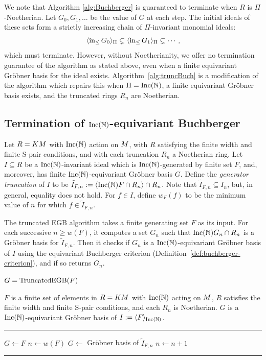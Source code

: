 We note that Algorithm \ref{alg:Buchberger} is guaranteed to terminate when $R$ is $\Pi$-Noetherian.  Let $G_0,G_1,\ldots$ be the value of $G$ at each step.  The initial ideals of these sets form a strictly increasing chain of $\Pi$-invariant monomial ideals:
 \[ \langle \operatorname{in}_{\leq} G_0 \rangle_\Pi \subsetneq \langle \operatorname{in}_{\leq} G_1 \rangle_\Pi \subsetneq \cdots,\]
which must terminate.  However, without Noetherianity, we offer no termination guarantee of the algorithm as stated above, even when a finite equivariant Gr\"obner basis for the ideal exists.  Algorithm~\ref{alg:truncBuch} is a modification of the algorithm which repairs this when $\Pi = \operatorname{Inc}(\mathbb N)$, a finite equivariant Gr\"obner basis exists, and the truncated rings $R_n$ are Noetherian.

\subsection{Termination of $\operatorname{Inc}(\mathbb N)$-equivariant Buchberger}
Let $R = KM$ with $\operatorname{Inc}(\mathbb N)$ action on $M$, with $R$ satisfying the finite width and finite S-pair conditions, and with each truncation $R_n$ a Noetherian ring.  Let $I \subseteq R$ be a $\operatorname{Inc}(\mathbb N)$-invariant ideal which is $\operatorname{Inc}(\mathbb N)$-generated by finite set $F$, and, moreover, has finite $\operatorname{Inc}(\mathbb N)$-equivariant Gr\"obner basis $G$.  Define the {\em generator truncation} of $I$ to be $\tilde{I}_{F,n} := \langle \operatorname{Inc}(\mathbb N) F \cap R_n \rangle \cap R_n$.  Note that $\tilde{I}_{F,n} \subseteq I_n$, but, in general, equality does not hold.  For $f \in I$, define $w_F(f)$ to be the minimum value of $n$ for which $f \in \tilde{I}_{F,n}$.

The truncated EGB algorithm takes a finite generating set $F$ as its input.  For each successive $n \geq w(F)$, it computes a set $G_n$ such that $\operatorname{Inc}(\mathbb N) G_n \cap R_n$ is a Gr\"obner basis for $\tilde{I}_{F,n}$.  Then it checks if $G_n$ is a $\operatorname{Inc}(\mathbb N)$-equivariant Gr\"obner basis of $I$ using the equivariant Buchberger criterion (Definition~\ref{def:buchberger-criterion}), and if so returns $G_n$.

\begin{algorithm}\label{alg:truncBuch}
$G = \operatorname{TruncatedEGB}(F)$
\begin{algorithmic}[1]
\REQUIRE $F$ is a finite set of elements in $R = KM$ with $\operatorname{Inc}(\mathbb N)$ acting on $M$, $R$ satisfies the finite width and finite S-pair conditions, and each $R_n$ is Noetherian.
\ENSURE $G$ is a $\operatorname{Inc}(\mathbb N)$-equivariant Gr\"obner basis of $I := \langle F \rangle_{\operatorname{Inc}(\mathbb N)}$.

\smallskip \hrule \smallskip

\STATE $G\gets F$
\STATE $n\gets w(F)$
	\STATE $G\gets$ Gr\"obner basis of $\tilde{I}_{F,n}$
	\STATE $n \gets n+1$
\ENDWHILE
\smallskip \hrule \smallskip
\end{algorithmic}
\end{algorithm}

